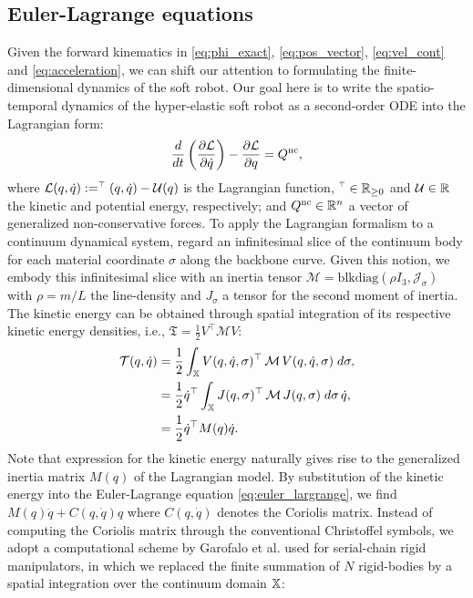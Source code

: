 {\subsection{Euler-Lagrange equations}
\noindent Given the forward kinematics in \eqref{eq:phi_exact}, \eqref{eq:pos_vector}, \eqref{eq:vel_cont} and \eqref{eq:acceleration}, we can shift our attention to formulating the finite-dimensional dynamics of the soft robot. Our goal here is to write the spatio-temporal dynamics of the hyper-elastic soft robot as a second-order ODE into the Lagrangian form:
%
\begin{equation}
\frac{d}{d t}\left(\frac{\partial \mathcal{L}}{\partial \dot{{q}}}\right) - \frac{\partial \mathcal{L}}{\partial {q}} = {Q}^{\textnormal{nc}}, \label{eq:euler_largrange}
\end{equation}
%
\noindent where $\La({q},\dot{q}) := \T(q,\dot{q}) - \mathcal{U}(q)$ is the Lagrangian function, $\T \in \Rp$ and $\mathcal{U}\in \mathbb{R}$ the kinetic and potential energy, respectively; and $Q^{\textnormal{nc}} \in \mathbb{R}^n$ a vector of generalized non-conservative forces. To apply the Lagrangian formalism to a continuum dynamical system, regard an infinitesimal slice of the continuum body for each material coordinate $\sigma$ along the backbone curve. Given this notion, we embody this infinitesimal slice with an inertia tensor $
\mathcal{M} = \text{blkdiag}(\rho I_3,\mathcal{J_\sigma})$ with $\rho = m/L$ the line-density and $J_\sigma$ a tensor for the second moment of inertia. The kinetic energy can be obtained through spatial integration of its respective kinetic energy densities\cite{Boyer2010,Mochiyama2003,Tatlicioglu2007}, i.e., $\mathfrak{T} = \frac{1}{2}V^\top \mathcal{M} V
$:
%
\begin{align}
\mathcal{T}({q},\dot{{q}}) & = \frac{1}{2}\int_{\mathbb{X}} {V}({q},\dot{q},\sigma)^\top\,\mathcal{M}\,{V}({q},\dot{{q}},\sigma) \; d \sigma,
 \notag \\
& =  \frac{1}{2} \dot{q}^\top \int_{\mathbb{X}}  J({q},\sigma)^\top\,\mathcal{M}\, J({q},\sigma) \; d \sigma \, \dot{q}, \notag \\
& = \frac{1}{2}\dot{q}^\top M(q) \dot{q}. \label{eq:kinetic_energy}
\end{align}
%
Note that expression for the kinetic energy naturally gives rise to the generalized inertia matrix $M(q)$ of the Lagrangian model. By substitution of the kinetic energy into the Euler-Lagrange equation \eqref{eq:euler_largrange}, we find $M(q)\ddot{q} + C(q,\dot{q})q$ where $C(q,\dot{q})$ denotes the Coriolis matrix. Instead of computing the Coriolis matrix through the conventional Christoffel symbols\cite{Murray1994}, we adopt a computational scheme by Garofalo et al. \cite{Garofalo2013} used for serial-chain rigid manipulators, in which we replaced the finite summation of $N$ rigid-bodies by a spatial integration over the continuum domain $\mathbb{X}$:
}
